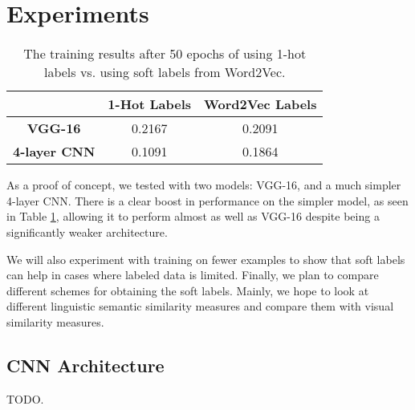 \section{Experiments}

\begin{table}[!tb]
  \centering
  \begin{tabular}{|c|c|c|}
    \hline
      & \textbf{1-Hot Labels} & \textbf{Word2Vec Labels} \\
    \hline
      \textbf{VGG-16} & 0.2167 & 0.2091 \\
    \hline
      \textbf{4-layer CNN} & 0.1091 & 0.1864 \\
    \hline
  \end{tabular}
  \caption{
    The training results after 50 epochs of using 1-hot labels vs. using soft
    labels from Word2Vec.
  }
  \label{tbl:results}
\end{table}


As a proof of concept, we tested with two models: VGG-16, and a much simpler
4-layer CNN. There is a clear boost in performance on the simpler model, as
seen in Table \ref{tbl:results}, allowing it to perform almost as well as
VGG-16 despite being a significantly weaker architecture.



We will also experiment with training on fewer examples to show that soft
labels can help in cases where labeled data is limited.
Finally, we plan to compare different schemes for obtaining the soft labels.
Mainly, we hope to look at different linguistic semantic similarity measures
and compare them with visual similarity measures.


\subsection{CNN Architecture}

TODO.

